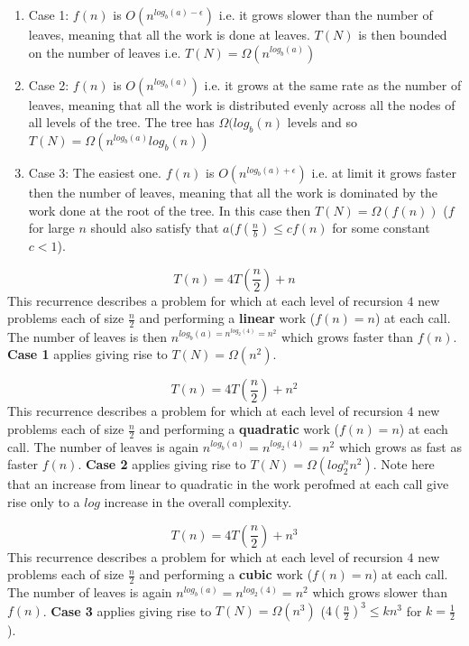 \begin{enumerate}
\item Case 1: $f(n)$ is $O(n^{log_b(a)-\epsilon})$ i.e. it grows slower than the number of leaves, meaning that all the work is done at leaves. $T(N)$ is then bounded on the number of leaves i.e. $T(N) = \Omega(n^{log_b(a)})$
	
\item Case 2: $f(n)$ is $O(n^{log_b(a)})$ i.e. it grows at the same rate as the number of leaves, meaning that all the work is distributed evenly across all the nodes of all levels of the tree. The tree has $\Omega(log_b(n)$ levels and so $T(N)= \Omega(n^{log_b(a)} log_b(n))$
	
\item Case 3: The easiest one. $f(n)$ is $O(n^{log_b(a) +\epsilon})$ i.e. at limit it grows faster then the number of leaves, meaning that all the work is dominated by the work done at the root of the tree. In this case then  $T(N)= \Omega(f(n))$ ($f$ for large $n$ should also satisfy that $a(f(\frac{n}{b}) \leq cf(n)$ for some constant $c<1$).
	
\end{enumerate} 

\begin{example}
\[
T(n) = 4T(\frac{n}{2}) + n
\]
This recurrence describes a problem for which at each level of recursion $4$ new problems each of size $\frac{n}{2}$ and performing a \textbf{linear} work ($f(n) =n$) at each call.
The number of leaves is then $n^{log_b(a) = n^{log_2(4)} = n^2} $ which grows faster than $f(n)$. \textbf{Case 1} applies giving rise to $T(N) = \Omega(n^2)$.
\end{example}


\begin{example}
\[
T(n) = 4T(\frac{n}{2}) + n^2
\]
This recurrence describes a problem for which at each level of recursion $4$ new problems each of size $\frac{n}{2}$ and performing a \textbf{quadratic} work ($f(n) =n$) at each call.
The number of leaves is again $n^{log_b(a)} = n^{log_2(4)} = n^2 $ which grows as fast as faster $f(n)$. \textbf{Case 2} applies giving rise to $T(N) = \Omega(log_2^{n} n^2)$. Note here that an increase from linear to quadratic in the work perofmed at each call give rise only to a $log$ increase in the overall complexity.

\end{example}

\begin{example}
\[
T(n) = 4T(\frac{n}{2}) + n^3
\]
This recurrence describes a problem for which at each level of recursion $4$ new problems each of size $\frac{n}{2}$ and performing a \textbf{cubic} work ($f(n) =n$) at each call.
The number of leaves is again $n^{log_b(a)} = n^{log_2(4)} = n^2 $ which grows slower than $f(n)$. \textbf{Case 3} applies giving rise to $T(N) = \Omega(n^3)$ ($4(\frac{n}{2})^3 \leq kn^3$ for $k=\frac{1}{2}$). 

\end{example}


